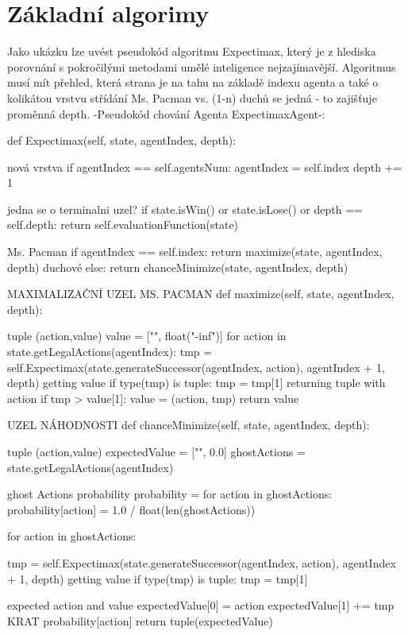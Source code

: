 \section{Základní algorimy}
Jako ukázku lze uvést pseudokód algoritmu Expectimax, který je z hlediska porovnání s pokročilými metodami umělé inteligence nejzajímavější. Algoritmus musí mít přehled, která strana je na tahu na základě indexu agenta a také o kolikátou vrstvu střídání Ms. Pacman vs. (1-n) duchů se jedná - to zajišťuje proměnná depth.
-Pseudokód chování Agenta ExpectimaxAgent-:

def Expectimax(self, state, agentIndex, depth):

    nová vrstva
    if agentIndex == self.agentsNum:
        agentIndex = self.index
        depth += 1

    jedna se o terminalni uzel?
    if state.isWin() or state.isLose() or depth == self.depth:
        return self.evaluationFunction(state)

    Ms. Pacman
    if agentIndex == self.index:
        return maximize(state, agentIndex, depth)
    duchové
    else:
        return chanceMinimize(state, agentIndex, depth)

MAXIMALIZAČNÍ UZEL MS. PACMAN
def maximize(self, state, agentIndex, depth):

     tuple (action,value)
    value = ["", float("-inf")]
    for action in state.getLegalActions(agentIndex):
        tmp = self.Expectimax(state.generateSuccessor(agentIndex, action), agentIndex + 1, depth)
         getting value
        if type(tmp) is tuple:
            tmp = tmp[1]
        returning tuple with action
        if tmp > value[1]:
            value = (action, tmp)
    return value

UZEL NÁHODNOSTI
def chanceMinimize(self, state, agentIndex, depth):

     tuple (action,value)
    expectedValue = ["", 0.0]
    ghostActions = state.getLegalActions(agentIndex)

     ghost Actions probability
    probability = {}
    for action in ghostActions:
        probability[action] = 1.0 / float(len(ghostActions))

    for action in ghostActions:

        tmp = self.Expectimax(state.generateSuccessor(agentIndex, action), agentIndex + 1, depth)
         getting value
        if type(tmp) is tuple:
            tmp = tmp[1]

        expected action and value
        expectedValue[0] = action
        expectedValue[1] += tmp KRAT probability[action]
    return tuple(expectedValue)


